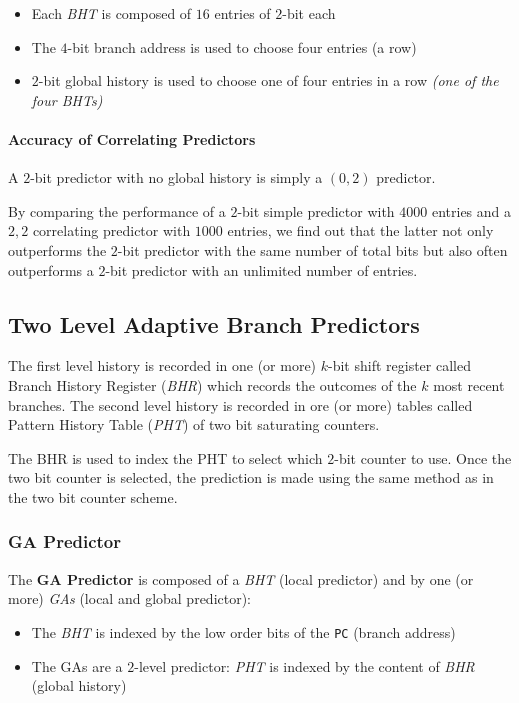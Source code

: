 \documentclass[english]{article}
\begin{document}
\begin{itemize}
  \item Each \textit{BHT} is composed of \(16\) entries of \(2\)-bit each
  \item The \(4\)-bit branch address is used to choose four entries (a row)
  \item \(2\)-bit global history is used to choose one of four entries in a row \textit{(one of the four \textit{BHTs})}
\end{itemize}

\paragraph{Accuracy of Correlating Predictors}

A \(2\)-bit predictor with no global history is simply a \((0, 2)\) predictor.

By comparing the performance of a \(2\)-bit simple predictor with \(4000\) entries and a \(2, 2\) correlating predictor with \(1000\) entries, we find out that the latter not only outperforms the \(2\)-bit predictor with the same number of total bits but also often outperforms a \(2\)-bit predictor with an unlimited number of entries.

\subsection{Two Level Adaptive Branch Predictors}

The first level history is recorded in one (or more) \(k\)-bit shift register called Branch History Register (\textit{BHR}) which records the outcomes of the \(k\) most recent branches.
The second level history is recorded in ore (or more) tables called Pattern History Table (\textit{PHT}) of two bit saturating counters.

The BHR is used to index the PHT to select which \(2\)-bit counter to use.
Once the two bit counter is selected, the prediction is made using the same method as in the two bit counter scheme.

\subsubsection{GA Predictor}

The \textbf{GA Predictor} is composed of a \textit{BHT} (local predictor) and by one (or more) \textit{GAs} (local and global predictor):

\begin{itemize}
  \item The \textit{BHT} is indexed by the low order bits of the \texttt{PC} (branch address)
  \item The GAs are a \(2\)-level predictor: \textit{PHT} is indexed by the content of \textit{BHR} (global history)
\end{itemize}
\end{document}
